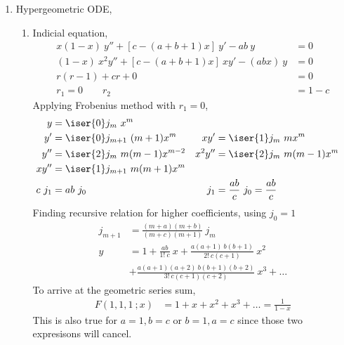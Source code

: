 \begin{enumerate}
    \item Hypergeometric ODE,
          \begin{enumerate}
              \item Indicial equation,
                    \begin{align}
                        x(1-x)\ y'' + [c - (a+b+1)x]\ y' - ab\ y       & = 0     \\
                        (1-x)\ x^2y'' + [c - (a+b+1)x]\ xy' - (abx)\ y & = 0     \\
                        r(r-1) + cr + 0                                & = 0     \\
                        r_1 = 0 \qquad r_2                             & = 1 - c
                    \end{align}
                    Applying Frobenius method with $ r_1  = 0$,
                    \begin{align}
                        y       & = \iser{0} j_m\ x^m                  \\
                        y'      & = \iser{0} j_{m+1}\ (m+1)x^{m}     &
                        xy'     & = \iser{1} j_m\ mx^{m}               \\
                        y''     & = \iser{2} j_m\ m(m-1)x^{m-2}      &
                        x^2 y'' & = \iser{2} j_m\ m(m-1)x^{m}          \\
                        xy''    & = \iser{1}j_{m+1}\ m(m+1)x^{m}       \\
                        c\ j_1  & = ab\ j_0                          &
                        j_1     & = \frac{ab}{c}\ j_0 = \frac{ab}{c}
                    \end{align}
                    Finding recursive relation for higher coefficients, using $ j_0=1 $
                    \begin{align}
                        j_{m+1} & = \frac{(m+a)(m+b)} {(m+c)(m+1)}\ j_m \\
                        y       & = 1 + \frac{ab}{1!\ c}\ x
                        + \frac{a(a+1)\ b(b+1)}{2!\ c(c+1)}\ x^2        \\
                                & + \frac{a(a+1)(a+2)\ b(b+1)(b+2)}
                        {3!\ c(c+1)(c+2)}\ x^3 + \dots
                    \end{align}
                    To arrive at the geometric series sum,
                    \begin{align}
                        F(1,1,1\ ;x) & = 1 + x + x^2 + x^3 + \dots = \frac{1}{1-x}
                    \end{align}
                    This is also true for $ a = 1, b = c $ or $ b = 1, a = c $ since
                    those two expresisons will cancel.


\end{enumerate}
\end{enumerate}
